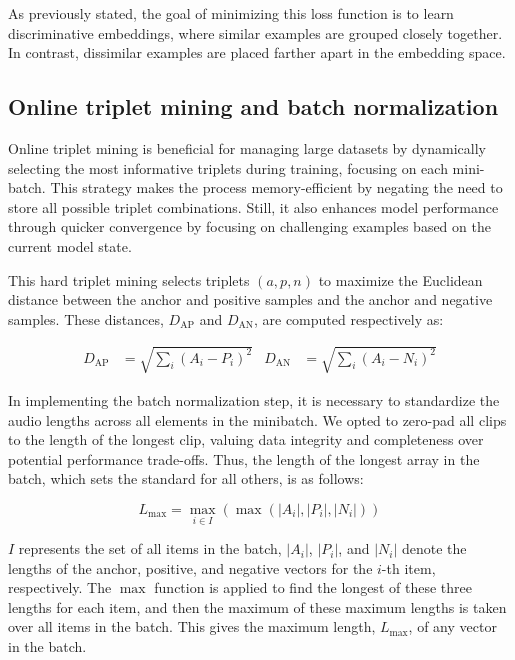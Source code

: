 As previously stated, the goal of minimizing this loss function is to learn discriminative embeddings, where similar examples are grouped closely together. In contrast, dissimilar examples are placed farther apart in the embedding space.

\subsection{Online triplet mining and batch normalization}

Online triplet mining is beneficial for managing large datasets by dynamically selecting the most informative triplets during training, focusing on each mini-batch. This strategy makes the process memory-efficient by negating the need to store all possible triplet combinations. Still, it also enhances model performance through quicker convergence by focusing on challenging examples based on the current model state.

This hard triplet mining selects triplets $(a, p, n)$ to maximize the Euclidean distance between the anchor and positive samples and the anchor and negative samples. These distances, $D_{\text{AP}}$ and $D_{\text{AN}}$, are computed respectively as:


\begin{align}
D_{\text{AP}} &= \sqrt{\sum_{i} (A_i - P_i)^2} & D_{\text{AN}} &= \sqrt{\sum_{i} (A_i - N_i)^2}
\end{align}


In implementing the batch normalization step, it is necessary to standardize the audio lengths across all elements in the minibatch. We opted to zero-pad all clips to the length of the longest clip, valuing data integrity and completeness over potential performance trade-offs. Thus, the length of the longest array in the batch, which sets the standard for all others, is as follows:

\begin{equation}
L_{\text{max}} = \max_{i \in I} \left( \max \left( |A_i|, |P_i|, |N_i| \right) \right)
\end{equation}

$I$ represents the set of all items in the batch, $|A_i|$, $|P_i|$, and $|N_i|$ denote the lengths of the anchor, positive, and negative vectors for the $i$-th item, respectively. The $\max$ function is applied to find the longest of these three lengths for each item, and then the maximum of these maximum lengths is taken over all items in the batch. This gives the maximum length, $L_{\text{max}}$, of any vector in the batch.

